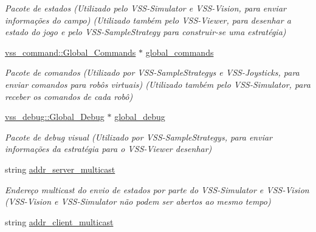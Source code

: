 \begin{DoxyCompactItemize}
\begin{DoxyCompactList}\small\item\em Pacote de estados (Utilizado pelo V\+S\+S-\/\+Simulator e V\+S\+S-\/\+Vision, para enviar informações do campo) (Utilizado também pelo V\+S\+S-\/\+Viewer, para desenhar a estado do jogo e pelo V\+S\+S-\/\+Sample\+Strategy para construir-\/se uma estratégia) \end{DoxyCompactList}\item 
\hyperlink{classvss__command_1_1Global__Commands}{vss\+\_\+command\+::\+Global\+\_\+\+Commands} $\ast$ \hyperlink{classInterface_a0109a54da68b3e7cd0c652f6cdd75abe}{global\+\_\+commands}\hypertarget{classInterface_a0109a54da68b3e7cd0c652f6cdd75abe}{}\label{classInterface_a0109a54da68b3e7cd0c652f6cdd75abe}

\begin{DoxyCompactList}\small\item\em Pacote de comandos (Utilizado por V\+S\+S-\/\+Sample\+Strategys e V\+S\+S-\/\+Joysticks, para enviar comandos para robôs virtuais) (Utilizado também pelo V\+S\+S-\/\+Simulator, para receber os comandos de cada robô) \end{DoxyCompactList}\item 
\hyperlink{classvss__debug_1_1Global__Debug}{vss\+\_\+debug\+::\+Global\+\_\+\+Debug} $\ast$ \hyperlink{classInterface_a2601489a867659e158bbff1bd2470411}{global\+\_\+debug}\hypertarget{classInterface_a2601489a867659e158bbff1bd2470411}{}\label{classInterface_a2601489a867659e158bbff1bd2470411}

\begin{DoxyCompactList}\small\item\em Pacote de debug visual (Utilizado por V\+S\+S-\/\+Sample\+Strategys, para enviar informações da estratégia para o V\+S\+S-\/\+Viewer desenhar) \end{DoxyCompactList}\item 
string \hyperlink{classInterface_ae3d7d6a6e2a04ab421b78ebeca7a92c6}{addr\+\_\+server\+\_\+multicast}\hypertarget{classInterface_ae3d7d6a6e2a04ab421b78ebeca7a92c6}{}\label{classInterface_ae3d7d6a6e2a04ab421b78ebeca7a92c6}

\begin{DoxyCompactList}\small\item\em Endereço multicast do envio de estados por parte do V\+S\+S-\/\+Simulator e V\+S\+S-\/\+Vision (V\+S\+S-\/\+Vision e V\+S\+S-\/\+Simulator não podem ser abertos ao mesmo tempo) \end{DoxyCompactList}\item 
string \hyperlink{classInterface_af7ac56d5815f432e4b0ba1ae0e55087e}{addr\+\_\+client\+\_\+multicast}\hypertarget{classInterface_af7ac56d5815f432e4b0ba1ae0e55087e}{}\label{classInterface_af7ac56d5815f432e4b0ba1ae0e55087e}


\end{DoxyCompactItemize}
